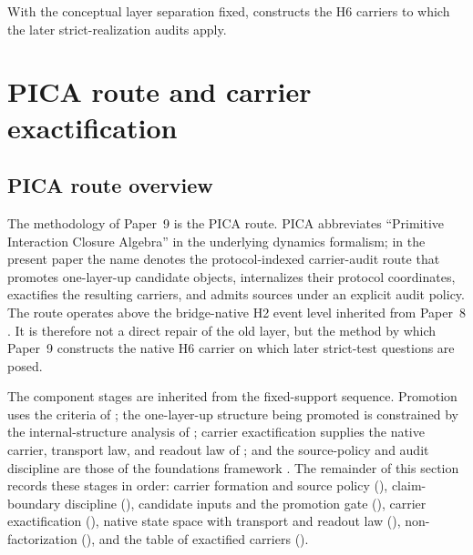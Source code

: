 \documentclass[11pt]{article}
\newcommand{\OldLayer}{H2}
\newcommand{\NewLayer}{H6}
\newcommand{\PaperNine}{Paper~9}
\newcommand{\PaperEight}{Paper~8}
\theoremstyle{definition}
\begin{document}
With the conceptual layer separation fixed,  constructs the
\NewLayer{} carriers to which the later strict-realization audits apply.
 \section{PICA route and carrier exactification}\label{sec:methods}

\subsection{PICA route overview}\label{subsec:pica-route-overview}

The methodology of \PaperNine{} is the PICA route.  PICA abbreviates
``Primitive Interaction Closure Algebra'' in the underlying dynamics
formalism; in the present paper the name denotes the protocol-indexed
carrier-audit route that promotes one-layer-up candidate objects, internalizes
their protocol coordinates, exactifies the resulting carriers, and admits
sources under an explicit audit policy.  The route operates above the
bridge-native \OldLayer{} event level inherited from \PaperEight{}
\cite{Tsiokos2026CarrierToEvent}.  It is therefore not a direct repair of the
old layer, but the method by which \PaperNine{} constructs the native
\NewLayer{} carrier on which later strict-test questions are posed.

The component stages are inherited from the fixed-support sequence.  Promotion
uses the criteria of \cite{Tsiokos2026PromotionCriteria}; the one-layer-up
structure being promoted is constrained by the internal-structure analysis of
\cite{Tsiokos2026InternalStructure}; carrier exactification supplies the native
carrier, transport law, and readout law of
\cite{Tsiokos2026CarrierExactification}; and the source-policy and audit
discipline are those of the foundations framework
\cite{Tsiokos2026FoundationsII}.  The remainder of this section records these
stages in order: carrier formation and source policy
(), claim-boundary
discipline (), candidate inputs and the
promotion gate (), carrier
exactification (), native state space with
transport and readout law (),
non-factorization (), and the table
of exactified carriers ().
\end{document}
